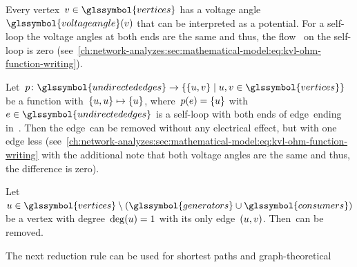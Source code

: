% 
Every vertex~$\vertex\in\glssymbol{vertices}$ has a voltage
angle~$\glssymbol{voltageangle}(\vertex)$ that can be interpreted as a
potential. For a self-loop the voltage angles at both ends are the same and
thus, the flow~ on the self-loop is zero
(see~\cref{ch:network-analyzes:sec:mathematical-model:eq:kvl-ohm-function-writing}).
% 
\begin{reductionrule}%
    Let~$
        p
        \colon
        \glssymbol{undirectededges}
        \to
        \{
            \{\vertexa,\vertexb\}
            \mid
            \vertexa,
            \vertexb
            \in
            \glssymbol{vertices}
        \}
    $
    be a function with~$
        \{u,u\} 
        \mapsto
        \{u\}
    $, where~$p(e)=
    \{u\}$ with~$\edge\in\glssymbol{undirectededges}$ is
    a self-loop with both ends of edge~\edge ending in~\vertexa. Then the
    edge~\edge can be removed without any electrical effect, but with one edge
    less
    (see~\cref{ch:network-analyzes:sec:mathematical-model:eq:kvl-ohm-function-writing}
    with the additional note that both voltage angles are the same and thus, the
    difference is zero).
    \label{ch:network-analyzes:sec:mathematical-model:sim:loop_contraction}
\end{reductionrule}%
% 
\begin{reductionrule}%
    Let~$
        \vertexa
        \in
        \glssymbol{vertices}
        \setminus
        (\glssymbol{generators}\cup\glssymbol{consumers})
    $ be a vertex with degree~$\operatorname{deg}(u) = 1$ with its only edge~$
    (u,v)$. Then~\vertexa can be removed.
    \label{ch:network-analyzes:sec:mathematical-model:sim:degree_1_contraction}%
\end{reductionrule}%
% 
% 
The next reduction rule can be used for shortest paths and graph-theoretical
